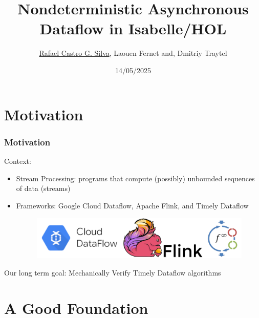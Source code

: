 \documentclass[fleqn,aspectratio=169,10pt]{beamer}
\title[Nondeterministic Asynchronous Dataflow in Isabelle/HOL]{Nondeterministic Asynchronous Dataflow in Isabelle/HOL}
\author[\underline{Rafael}, Laouen and, Dmitriy]{
  \underline{Rafael Castro G. Silva}, Laouen Fernet and,  Dmitriy Traytel\\\medskip
  }
\date{14/05/2025}
\institute[UCPH]{
  Department of Computer Science \\
  University of Copenhagen}
\begin{document}

\begin{frame}
  \titlepage
\end{frame}

\section{Motivation}

\begin{frame}[fragile]
  \frametitle{Motivation}
  \begin{block}{Context:}
  \begin{itemize}
    \item Stream Processing: programs that compute (possibly) unbounded sequences of data (streams)
    \item Frameworks: Google Cloud Dataflow, Apache Flink, and Timely Dataflow
          \begin{figure}
            \centering
            \includegraphics[scale=0.1]{all}
          \end{figure}
  \end{itemize}
  \pause
  \end{block}
  \begin{block}{Our long term goal:}
    Mechanically Verify Timely Dataflow algorithms
  \end{block}
\end{frame}

\section{A Good Foundation}
\end{document}
